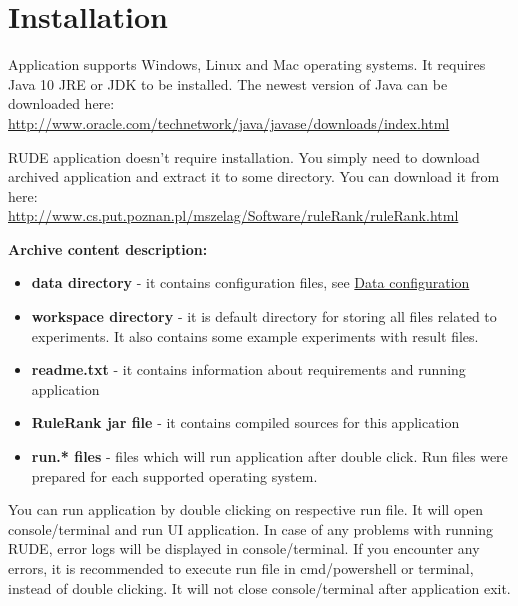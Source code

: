\section{Installation}\label{section:install}

Application supports Windows, Linux and Mac operating systems. It requires Java 10 JRE or JDK to be installed. The newest version of Java can be downloaded here:\\ \href{http://www.oracle.com/technetwork/java/javase/downloads/index.html}{http://www.oracle.com/technetwork/java/javase/downloads/index.html}


RUDE application doesn't require installation. You simply need to download archived application and extract it to some directory. You can download it from here:\\ \href{http://www.cs.put.poznan.pl/mszelag/Software/ruleRank/ruleRank.html}{http://www.cs.put.poznan.pl/mszelag/Software/ruleRank/ruleRank.html}\newline

\textbf{Archive content description:}
\begin{itemize}
	\item \textbf{data directory} - it contains configuration files, see \hyperref[section:data-config]{Data configuration}
	\item \textbf{workspace directory} - it is default directory for storing all files related to experiments. It also contains some example experiments with result files.
	\item \textbf{readme.txt} - it contains information about requirements and running application
	\item \textbf{RuleRank jar file} - it contains compiled sources for this application
	\item \textbf{run.* files} - files which will run application after double click. Run files were prepared for each supported operating system.
\end{itemize}

You can run application by double clicking on respective run file. It will open console/terminal and run UI application. In case of any problems with running RUDE, error logs will be displayed in console/terminal. If you encounter any errors, it is recommended to execute run file in cmd/powershell or terminal, instead of double clicking. It will not close console/terminal after application exit.


\vfill\newpage